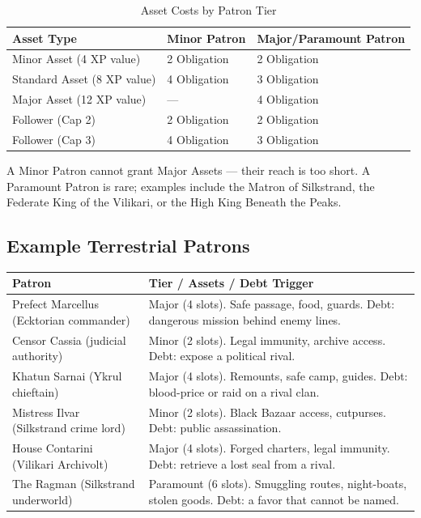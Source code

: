 \begin{table}[htbp]
\centering
\small
\begin{tabularx}{\linewidth}{lXX}
\toprule
\textbf{Asset Type} & \textbf{Minor Patron} & \textbf{Major/Paramount Patron} \\
\midrule
Minor Asset (4 XP value) & 2 Obligation & 2 Obligation \\
Standard Asset (8 XP value) & 4 Obligation & 3 Obligation \\
Major Asset (12 XP value) & --- & 4 Obligation \\
Follower (Cap 2) & 2 Obligation & 2 Obligation \\
Follower (Cap 3) & 4 Obligation & 3 Obligation \\
\bottomrule
\end{tabularx}
\caption{Asset Costs by Patron Tier}
\label{tab:asset-costs}
\end{table}

\noindent A Minor Patron cannot grant Major Assets --- their reach is too short. A Paramount Patron is rare; examples include the Matron of Silkstrand, the Federate King of the Vilikari, or the High King Beneath the Peaks.

\subsection{Example Terrestrial Patrons}

\begin{tcolorbox}[title=Sample Terrestrial Patrons, colback=white!97!gray, colframe=black!80!gray,breakable]
\begin{tabularx}{\linewidth}{lX}
\toprule
\textbf{Patron} & \textbf{Tier / Assets / Debt Trigger} \\
\midrule
Prefect Marcellus (Ecktorian commander) & Major (4 slots). Safe passage, food, guards. Debt: dangerous mission behind enemy lines. \\
Censor Cassia (judicial authority) & Minor (2 slots). Legal immunity, archive access. Debt: expose a political rival. \\
Khatun Sarnai (Ykrul chieftain) & Major (4 slots). Remounts, safe camp, guides. Debt: blood-price or raid on a rival clan. \\
Mistress Ilvar (Silkstrand crime lord) & Minor (2 slots). Black Bazaar access, cutpurses. Debt: public assassination. \\
House Contarini (Vilikari Archivolt) & Major (4 slots). Forged charters, legal immunity. Debt: retrieve a lost seal from a rival. \\
The Ragman (Silkstrand underworld) & Paramount (6 slots). Smuggling routes, night-boats, stolen goods. Debt: a favor that cannot be named. \\
\bottomrule
\end{tabularx}
\end{tcolorbox}

